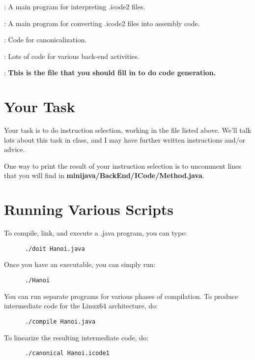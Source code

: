 \documentclass[11pt]{article}
\begin{document}
\mbox{}\par{}:  A main program for interpreting .icode2 files.

\mbox{}\par{}:  A main program for converting .icode2 files into assembly code.

\mbox{}\par{}:  Code for canonicalization.

\mbox{}\par{}:  Lots of code for various back-end activities.

\mbox{}\par{}:  {\bf This is the file that you should fill in to do code generation.}

\section{Your Task}
Your task is to do instruction selection, working in the file listed above.  We'll talk lots about this task in class, and I may have further written instructions and/or advice.  

One way to print the result of your instruction selection is to uncomment lines that you will find in {\bf minijava/BackEnd/ICode/Method.java}.

\section{Running Various Scripts}

To compile, link, and execute a .java program, you can type:

\begin{verbatim}
      ./doit Hanoi.java
\end{verbatim}

Once you have an executable, you can simply run:
\begin{verbatim}
      ./Hanoi
\end{verbatim}

You can run separate programs for various phases of compilation.  To produce intermediate code for the Linux64 architecture, do:
\begin{verbatim}
      ./compile Hanoi.java
\end{verbatim}

To linearize the resulting intermediate code, do:
\begin{verbatim}
      ./canonical Hanoi.icode1
\end{verbatim}
\end{document}

